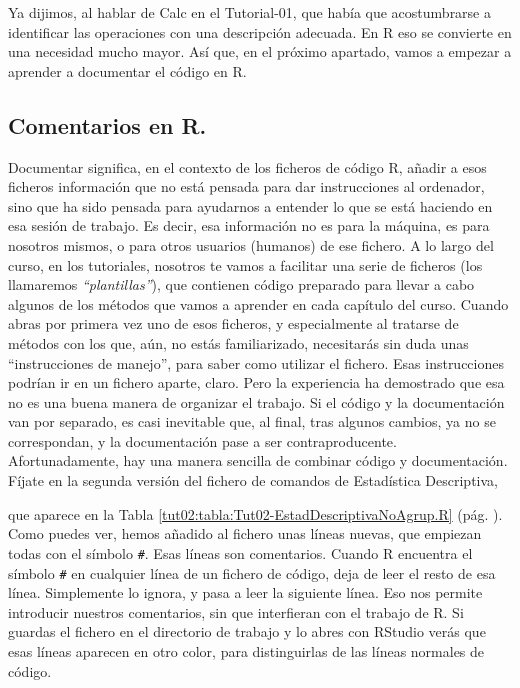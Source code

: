 \documentclass[10pt,a4paper]{article}\usepackage[]{graphicx}\usepackage[]{color}
\newcounter {cont01}
\begin{document}
        \begin{center}
        \end{center}

Ya dijimos, al hablar de Calc en el Tutorial-01, que había que acostumbrarse a identificar las operaciones con una descripción adecuada. En R eso se convierte en una necesidad mucho mayor. Así que, en el próximo apartado, vamos a empezar a aprender a documentar el código en R.


\subsection{Comentarios en R.}
\label{tut02:subsec:ComentariosR}

Documentar significa, en el contexto de los ficheros de código R, añadir a esos ficheros información que no está pensada para dar instrucciones al ordenador, sino que ha sido  pensada para ayudarnos a entender lo que se está haciendo en esa sesión de trabajo. Es decir, esa información no es para la máquina, es para nosotros mismos, o para otros usuarios (humanos) de ese fichero. A lo largo del curso, en los tutoriales, nosotros te vamos a facilitar una serie de ficheros (los llamaremos {\em ``plantillas''}), que contienen código preparado para llevar a cabo algunos de los métodos que vamos a aprender en cada capítulo del curso. Cuando abras por primera vez uno de esos ficheros, y especialmente al tratarse de métodos con los que, aún, no estás familiarizado, necesitarás sin duda unas ``instrucciones de manejo'', para saber como utilizar el fichero. Esas instrucciones podrían ir en un fichero aparte, claro. Pero la experiencia ha demostrado que esa no es una buena manera de organizar el trabajo. Si el código y la documentación van por separado, es casi inevitable que, al final, tras algunos cambios, ya no se correspondan, y la documentación pase a ser contraproducente.  Afortunadamente, hay una manera sencilla de combinar código y documentación. Fíjate en la segunda versión del fichero de comandos de Estadística Descriptiva,
\begin{center}
\end{center}
que aparece en la Tabla \ref{tut02:tabla:Tut02-EstadDescriptivaNoAgrup.R} (pág. \pageref{tut02:tabla:Tut02-EstadDescriptivaNoAgrup.R}). Como puedes ver, hemos añadido al fichero unas líneas nuevas, que empiezan todas con el símbolo \verb&#&. Esas líneas son {\sf comentarios}. Cuando R encuentra el símbolo \verb&#& en cualquier línea de un fichero de código, deja de leer el resto de esa línea. Simplemente lo ignora, y pasa a leer la siguiente línea. Eso nos permite introducir nuestros comentarios, sin que interfieran con el trabajo de R. Si guardas el fichero en el directorio de trabajo y lo abres con RStudio verás que esas líneas aparecen en otro color, para distinguirlas de las líneas normales de código.\\
\end{document}
